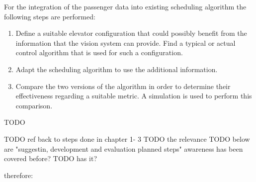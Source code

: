 For the integration of the  passenger data into existing scheduling algorithm the following steps are performed:

\begin{enumerate}
    \item Define a suitable elevator configuration that could possibly benefit from the information that the vision system can provide. 
    Find a typical or actual control algorithm that is used for such a configuration.
    \item Adapt the scheduling algorithm to use the additional information.
    \item Compare the two versions of the algorithm in order to determine their effectiveness regarding a suitable metric.
    A simulation is used to perform this comparison.
\end{enumerate}

TODO

TODO ref back to steps done in chapter 1- 3
TODO the relevance
TODO below are "suggestin, development and evaluation planned steps" awareness has been covered before? TODO has it?


therefore:



